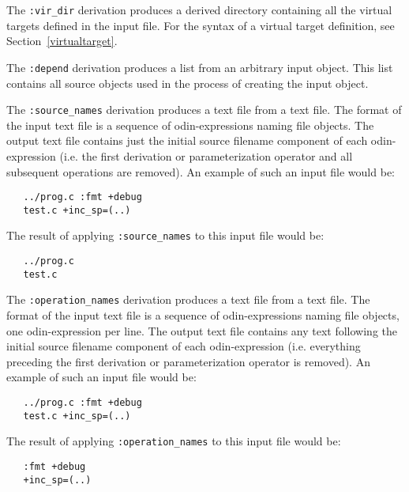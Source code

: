 \documentclass[hidelinks]{report}
\newcommand{\ex}{\tt}   %
\begin{document}
The {\ex :vir\_dir} derivation produces a derived directory
containing all the virtual targets defined in the input file.
For the syntax of a virtual target definition,
see Section~\ref{virtualtarget}.

The {\ex :depend} derivation produces a list
from an arbitrary input object.
This list contains all source objects used in the process
of creating the input object.

The {\ex :source\_names} derivation produces a text file from a text file.
The format of the input text file is a sequence of odin-expressions
naming file objects.
The output text file contains just the initial source filename component
of each odin-expression (i.e. the first derivation or parameterization
operator and all subsequent operations are removed).
An example of such an input file would be:
\begin{verbatim}
   ../prog.c :fmt +debug
   test.c +inc_sp=(..)
\end{verbatim}
The result of applying {\ex :source\_names} to this input file would be:
\begin{verbatim}
   ../prog.c
   test.c
\end{verbatim}

The {\ex :operation\_names} derivation produces a text file from a text file.
The format of the input text file is a sequence of odin-expressions
naming file objects, one odin-expression per line.
The output text file contains any text following the initial source
filename component of each odin-expression (i.e. everything preceding
the first derivation or parameterization operator is removed).
An example of such an input file would be:
\begin{verbatim}
   ../prog.c :fmt +debug
   test.c +inc_sp=(..)
\end{verbatim}
The result of applying {\ex :operation\_names} to this input file would be:
\begin{verbatim}
   :fmt +debug
   +inc_sp=(..)
\end{verbatim}
\end{document}
